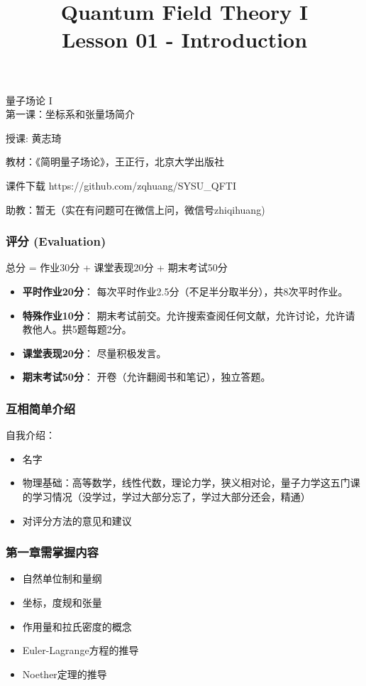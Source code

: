 \documentclass[CJK]{beamer}
\title{Quantum Field Theory I \\ Lesson 01 - Introduction}
\author{}
\date{}
\begin{document}
\begin{frame}
 
\begin{center}
\begin{Large}
\bch
量子场论 I \\
第一课：坐标系和张量场简介

{\vskip 0.3in}

授课: 黄志琦

\ech
\end{Large}
\end{center}

\vskip 0.2in

\bch
教材：《简明量子场论》，王正行，北京大学出版社
\ech

\bch
课件下载
\ech
https://github.com/zqhuang/SYSU\_QFTI

\bch
助教：暂无（实在有问题可在微信上问，微信号zhiqihuang)
\ech
\end{frame}

\begin{frame}
\frametitle{\bch 评分 \ech (Evaluation)}
\bch
总分 = 作业30分 + 课堂表现20分  + 期末考试50分

\begin{itemize}
\item{{\bf 平时作业20分}： 每次平时作业2.5分（不足半分取半分），共8次平时作业。 }
\item{ {\bf 特殊作业10分}： 期末考试前交。允许搜索查阅任何文献，允许讨论，允许请教他人。拱5题每题2分。}
\item{{\bf 课堂表现20分}： 尽量积极发言。}
\item{ {\bf 期末考试50分}： 开卷（允许翻阅书和笔记），独立答题。}
\end{itemize}
\ech
\end{frame}

\begin{frame}
\frametitle{\bch 互相简单介绍 \ech}
\bch
自我介绍：
\begin{itemize}
\item{名字}
\item{物理基础：高等数学，线性代数，理论力学，狭义相对论，量子力学这五门课的学习情况（没学过，学过大部分忘了，学过大部分还会，精通）}
\item{对评分方法的意见和建议}
\end{itemize}
\ech
\end{frame}

\begin{frame}
\frametitle{\bch 第一章需掌握内容 \ech}
\begin{itemize}
\bch 
\item{自然单位制和量纲}
\item{坐标，度规和张量}
\item{作用量和拉氏密度的概念}
\item{Euler-Lagrange方程的推导}
\item{Noether定理的推导}
\ech
\end{itemize}

\end{frame}
\end{document}
